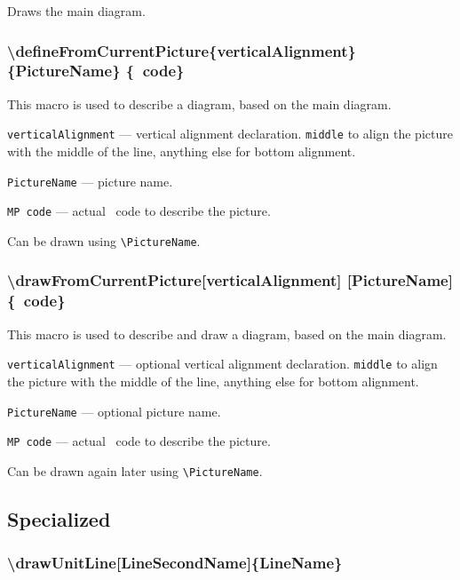 \documentclass{ltxdoc}
\begin{document}
	Draws the main diagram.




\subsubsection{\textbackslash defineFromCurrentPicture\{verticalAlignment\} \{PictureName\} \{\METAPOST\ code\}}

	This macro is used to describe a diagram, based on the main diagram.

	\texttt{verticalAlignment} — vertical alignment declaration. \texttt{middle} to align the picture with the middle of the line, anything else for bottom alignment.

	\texttt{PictureName} — picture name.

	\texttt{MP code} — actual \METAPOST\ code to describe the picture.
	
	Can be drawn using \texttt{\textbackslash PictureName}.
	
\subsubsection{\textbackslash drawFromCurrentPicture[verticalAlignment] [PictureName] \{\METAPOST\ code\}}

	This macro is used to describe and draw a diagram, based on the main diagram.

	\texttt{verticalAlignment} — optional vertical alignment declaration. \texttt{middle} to align the picture with the middle of the line, anything else for bottom alignment.

	\texttt{PictureName} — optional picture name.

	\texttt{MP code} — actual \METAPOST\ code to describe the picture.
	
	Can be drawn again later using \texttt{\textbackslash PictureName}.


\subsection{Specialized}

\subsubsection{\textbackslash drawUnitLine[LineSecondName]\{LineName\}}
\end{document}
